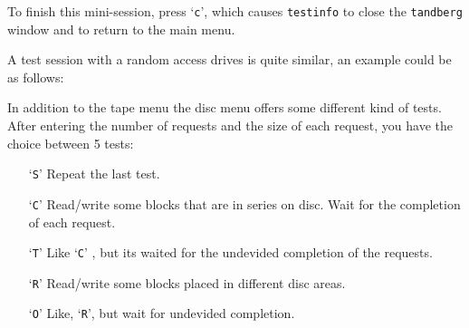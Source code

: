 To finish this mini-session, press `{\tt c}', which causes {\tt testinfo} to
close the {\tt tandberg} window and to return to the main menu.

A test session with a random access drives is quite similar, an example could
be as follows:



In addition to the tape menu the disc menu offers some different kind of
tests. After entering the number of requests and the size of each request, you
have the choice between 5 tests:

\begin{itemize}

  \item [`{\tt S}'] Repeat the last test.

  \item [`{\tt C}'] Read/write some blocks that are in series on disc. Wait
                    for the completion of each request.

  \item [`{\tt T}'] Like `{\tt C}' , but its waited for the undevided
                    completion of the requests.

  \item [`{\tt R}'] Read/write some blocks placed in different disc areas.

  \item [`{\tt O}'] Like, `{\tt R}', but wait for undevided completion.

\end{itemize}
